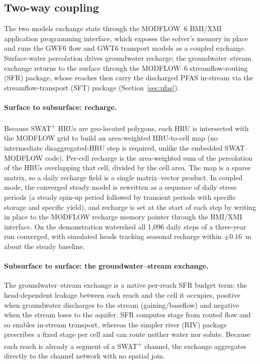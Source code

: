 \subsection{Two-way coupling}
\label{sec:coupling}

The two models exchange state through the MODFLOW~6 BMI/XMI application programming interface, which
exposes the solver's memory in place and runs the GWF6 flow and GWT6 transport models as a coupled
exchange. Surface-water percolation drives groundwater recharge; the groundwater--stream exchange
returns to the surface through the MODFLOW~6 streamflow-routing (SFR) package, whose reaches then
carry the discharged PFAS in-stream via the streamflow-transport (SFT) package (Section~\ref{sec:pfas}).

\paragraph{Surface to subsurface: recharge.} Because SWAT\textsuperscript{+} HRUs are
geo-located polygons, each HRU is intersected with the MODFLOW grid to build an area-weighted
HRU-to-cell map (no intermediate disaggregated-HRU step is required, unlike the embedded
SWAT--MODFLOW code). Per-cell recharge is the area-weighted sum of the percolation of the HRUs
overlapping that cell, divided by the cell area. The map is a sparse matrix, so a daily recharge
field is a single matrix--vector product. In coupled mode, the converged steady model is
rewritten as a sequence of daily stress periods (a steady spin-up period followed by transient
periods with specific storage and specific yield), and recharge is set at the start of each step
by writing in place to the MODFLOW recharge memory pointer through the BMI/XMI interface. On the
demonstration watershed all 1{,}096 daily steps of a three-year run converged, with simulated heads
tracking seasonal recharge within $\pm0.16$~m about the steady baseline.

\paragraph{Subsurface to surface: the groundwater--stream exchange.} The groundwater--stream
exchange is a native per-reach SFR budget term: the head-dependent leakage between each reach and the
cell it occupies, positive when groundwater discharges to the stream (gaining/baseflow) and negative
when the stream loses to the aquifer. SFR computes stage from routed flow and so enables in-stream
transport, whereas the simpler river (RIV) package prescribes a fixed stage per cell and can route
neither water nor solute. Because each reach is already a segment of a SWAT\textsuperscript{+}
channel, the exchange aggregates directly to the channel network with no spatial join.

